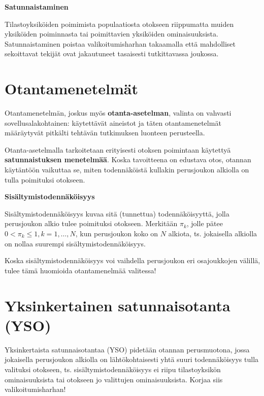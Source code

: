 \documentclass[
]{report}
\begin{document}
\begin{defblock}{}
\textbf{Satunnaistaminen}

Tilastoyksiköiden poimimista populaatiosta otokseen riippumatta muiden
yksiköiden poiminnasta tai poimittavien yksiköiden ominaisuuksista.
Satunnaistaminen poistaa valikoitumisharhan takaamalla että mahdolliset
sekoittavat tekijät ovat jakautuneet tasaisesti tutkittavassa joukossa.

\end{defblock}

\hypertarget{otantamenetelmuxe4t}{%
\section{Otantamenetelmät}\label{otantamenetelmuxe4t}}

Otantamenetelmän, joskus myös \textbf{otanta-asetelman}, valinta on
vahvasti sovellusalakohtainen: käytettävät aineistot ja täten
otantamenetelmät määräytyvät pitkälti tehtävän tutkimuksen luonteen
perusteella.

Otanta-asetelmalla tarkoitetaan erityisesti otoksen poimintaan käytettyä
\textbf{satunnaistuksen menetelmää}. Koska tavoitteena on edustava otos,
otannan käytäntöön vaikuttaa se, miten todennäköistä kullakin
perusjoukon alkiolla on tulla poimituksi otokseen.

\begin{defblock}{}
\textbf{Sisältymistodennäköisyys}

Sisältymistodennäköisyys kuvaa sitä (tunnettua) todennäköisyyttä, jolla
perusjoukon alkio tulee poimituksi otokseen. Merkitään \(\pi_k\), jolle
pätee \(0 < \pi_k \leq 1, k = 1,\dots,N\), kun perusjoukon koko on \(N\)
alkiota, ts. jokaisella alkiolla on nollaa suurempi
sisältymistodennäköisyys.

\end{defblock}

Koska sisältymistodennäköisyys voi vaihdella perusjoukon eri
osajoukkojen välillä, tulee tämä huomioida otantamenelmää valitessa!

\hypertarget{yksinkertainen-satunnaisotanta-yso}{%
\section{Yksinkertainen satunnaisotanta
(YSO)}\label{yksinkertainen-satunnaisotanta-yso}}

Yksinkertaista satunnaisotantaa (YSO) pidetään otannan perusmuotona,
jossa jokaisella perusjoukon alkiolla on lähtökohtaisesti yhtä suuri
todennäköisyys tulla valituksi otokseen, ts. sisältymistodennäköisyys ei
riipu tilastoyksikön ominaisuuksista tai otokseen jo valittujen
ominaisuuksista. Korjaa siis valikoitumisharhan!
\end{document}
